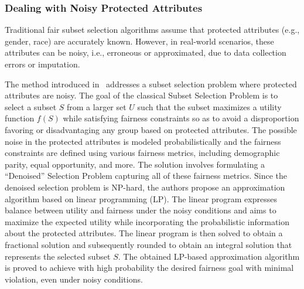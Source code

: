 \subsubsection{Dealing with Noisy Protected Attributes}
\label{subsec:intrank_meth_constr_12n}

Traditional fair subset selection algorithms assume that protected attributes (e.g., gender, race) are accurately known. However, in real-world scenarios, these attributes can be noisy, i.e., erroneous or approximated, due to data collection errors or imputation.

The method introduced in~\cite{mehrotra2021mitigating} addresses a subset selection problem where protected attributes are noisy.
The goal of the classical Subset Selection Problem is to select a subset $S$ from a larger set $U$ such that the subset maximizes a utility function $f(S)$ while satisfying fairness constraints so as to avoid a disproportion favoring or disadvantaging any group based on protected attributes.
The possible noise in the protected attributes is modeled probabilistically and the fairness constraints are defined using various fairness metrics, including demographic parity, equal opportunity, and more.
%
The solution involves formulating a ``Denoised'' Selection Problem capturing all of these fairness metrics.
%
Since the denoised selection problem is NP-hard, the authors propose an approximation algorithm based on linear programming (LP). The linear program expresses balance between utility and fairness under the noisy conditions and aims to maximize the expected utility while incorporating the probabilistic information about the protected attributes. The linear program is then solved to obtain a fractional solution and subsequently rounded to obtain an integral solution that represents the selected subset $S$.
The obtained LP-based approximation algorithm is proved to achieve with high probability the desired fairness goal with minimal violation, even under noisy conditions.




